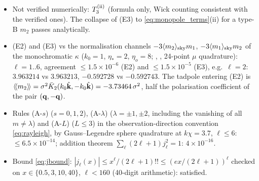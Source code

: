 \begin{itemize}
\item[H-10] Not verified numerically: $T^{\rm(ii)}_3$ (formula only, Wick counting consistent with the verified ones).  The collapse of (E3) to \eqref{eq:monopole_terms}(ii) for a type-B $m_2$ passes analytically.
\item[H-14] (E2) and (E3) vs the normalisation channels $-3\langle m_2\rangle_{\rm sky}m_1$, $-3\langle m_1\rangle_{\rm sky}m_2$ of the monochromatic $\kappa$ ($k_0=1$, $\eta_*=2$, $\eta_o=8$; , , 24-point $\mu$ quadrature): $\ell=1..6$, agreement $\le1.5\times10^{-6}$ (E2) and $\le1.5\times10^{-5}$ (E3), e.g.\ $\ell=2$: $3.963214$ vs $3.963213$, $-0.592728$ vs $-0.592743$.  The tadpole entering (E2) is $\langle\!\langle m_2\rangle\!\rangle=\sigma^2\bar K_2(k_0\hat{\mathbf k},-k_0\hat{\mathbf k})=-3.73464\,\sigma^2$, half the polarisation coefficient of the pair $(\mathbf q,-\mathbf q)$.
\item[H-11] Rules (A-$s$) ($s=0,1,2$), (A-$\lambda$) ($\lambda=\pm1,\pm2$, including the vanishing of all $m\neq\lambda$) and (A-$L$) ($L\le3$) in the observation-direction convention \eqref{eq:rayleigh}, by Gauss--Legendre sphere quadrature at $k\chi=3.7$, $\ell\le6$: $\le6.5\times10^{-14}$; addition theorem $\sum_\ell(2\ell+1)j_\ell^2=1$: $4\times10^{-16}$.
\item[H-12] Bound \eqref{eq:jbound}: $|j_\ell(x)|\le x^\ell/(2\ell+1)!!\le(ex/(2\ell+1))^\ell$ checked on $x\in\{0.5,3,10,40\}$, $\ell<160$ (40-digit arithmetic): satisfied.
\end{itemize}

